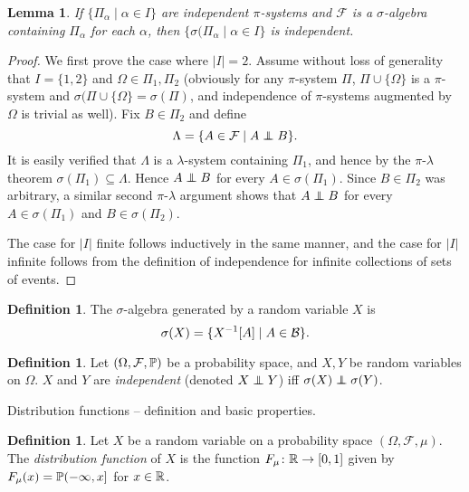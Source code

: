 \documentclass{amsart}
\newtheorem{lemma}[theorem]{Lemma}
\theoremstyle{definition}
\newtheorem{definition}[theorem]{Definition}
\theoremstyle{remark}
\newcommand{\bldset}[2]{\{{#1}\mid{#2}\}}
\newcommand\indep{\protect\mathpalette{\protect\independenT}{\perp}}
\def\independenT#1#2{\mathrel{\rlap{$#1#2$}\mkern2mu{#1#2}}}
\begin{document}
\begin{lemma}
If $\bldset{\Pi_\alpha}{\alpha \in I}$ are independent $\pi$-systems and $\mathcal F$ is a $\sigma$-algebra containing $\Pi_\alpha$ for each $\alpha$, then $\bldset{\sigma(\Pi_\alpha}{\alpha \in I}$ is independent.
\end{lemma}

\begin{proof}
We first prove the case where $|I| = 2$. Assume without loss of generality that $I = \{1,2\}$ and $\Omega \in \Pi_1, \Pi_2$ (obviously for any $\pi$-system $\Pi$, $\Pi \cup \{\Omega\}$ is a $\pi$-system and $\sigma(\Pi \cup \{\Omega\} = \sigma(\Pi)$, and independence of $\pi$-systems augmented by $\Omega$ is trivial as well). Fix $B \in \Pi_2$ and define
\[ \Lambda = \bldset{A \in \mathcal F}{A \indep B}. \]
It is easily verified that $\Lambda$ is a $\lambda$-system containing $\Pi_1$, and hence by the $\pi$-$\lambda$ theorem $\sigma(\Pi_1) \subseteq \Lambda$. Hence $A \indep B$ for every $A \in \sigma(\Pi_1)$. Since $B \in \Pi_2$ was arbitrary, a similar second $\pi$-$\lambda$ argument shows that $A \indep B$ for every $A \in \sigma(\Pi_1)$ and $B \in \sigma(\Pi_2)$.

The case for $|I|$ finite follows inductively in the same manner, and the case for $|I|$ infinite follows from the definition of independence for infinite collections of sets of events.
\end{proof}


\begin{definition}
The $\sigma$-algebra generated by a random variable $X$ is
\[ \sigma(X) = \bldset{X\inv[A]}{A \in \mathcal B}. \]
\end{definition}

\begin{definition}
Let $(\Omega, \mathcal F, \P)$ be a probability space, and $X, Y$ be random variables on $\Omega$. $X$ and $Y$ are {\em independent} (denoted $X \indep Y$) iff $\sigma(X) \indep \sigma(Y)$.
\end{definition}

Distribution functions -- definition and basic properties.

\begin{definition}
Let $X$ be a random variable on a probability space $(\Omega, \mathcal F, \mu)$. The {\em distribution function} of $X$ is the function $F_\mu\colon \R \rightarrow [0,1]$ given by $F_\mu(x) = \P (-\infty, x]$ for $x \in \R$.
\end{definition}
\end{document}

